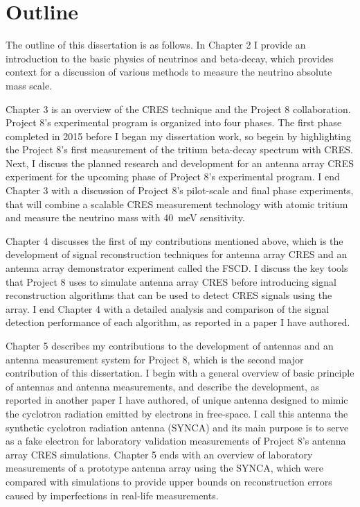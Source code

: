 \section{Outline}

The outline of this dissertation is as follows. In Chapter 2 I provide an introduction to the basic physics of neutrinos and beta-decay, which provides context for a discussion of various methods to measure the neutrino absolute mass scale. 

Chapter 3 is an overview of the CRES technique and the Project 8 collaboration. Project 8's experimental program is organized into four phases. The first phase completed in 2015 before I began my dissertation work, so begein by highlighting the Project 8's first measurement of the tritium beta-decay spectrum with CRES. Next, I discuss the planned research and development for an antenna array CRES experiment for the upcoming phase of Project 8's experimental program. I end Chapter 3 with a discussion of Project 8's pilot-scale and final phase experiments, that will combine a scalable CRES measurement technology with atomic tritium and measure the neutrino mass with 40~meV sensitivity.

Chapter 4 discusses the first of my contributions mentioned above, which is the development of signal reconstruction techniques for antenna array CRES and an antenna array demonstrator experiment called the FSCD. I discuss the key tools that Project 8 uses to simulate antenna array CRES before introducing signal reconstruction algorithms that can be used to detect CRES signals using the array. I end Chapter 4 with a detailed analysis and comparison of the signal detection performance of each algorithm, as reported in a paper I have authored.

Chapter 5 describes my contributions to the development of antennas and an antenna measurement system for Project 8, which is the second major contribution of this dissertation. I begin with a general overview of basic principle of antennas and antenna measurements, and describe the development, as reported in another paper I have authored, of unique antenna designed to mimic the cyclotron radiation emitted by electrons in free-space. I call this antenna the synthetic cyclotron radiation antenna (SYNCA) and its main purpose is to serve as a fake electron for laboratory validation measurements of Project 8's antenna array CRES simulations. Chapter 5 ends with an overview of laboratory measurements of a prototype antenna array using the SYNCA, which were compared with simulations to provide upper bounds on reconstruction errors caused by imperfections in real-life measurements.

